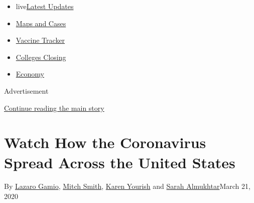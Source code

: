 \begin{itemize}
\tightlist
\item
  live\href{https://www.nytimes3xbfgragh.onion/2020/08/20/world/coronavirus-covid.html?name=styln-coronavirus-national\&region=TOP_BANNER\&variant=undefined\&block=storyline_menu_recirc\&action=click\&pgtype=Interactive\&impression_id=7c496f31-e38e-11ea-9d1b-a1f39ff1b44f}{Latest
  Updates}
\item
  \href{https://www.nytimes3xbfgragh.onion/interactive/2020/us/coronavirus-us-cases.html?name=styln-coronavirus-national\&region=TOP_BANNER\&variant=undefined\&block=storyline_menu_recirc\&action=click\&pgtype=Interactive\&impression_id=7c499640-e38e-11ea-9d1b-a1f39ff1b44f}{Maps
  and Cases}
\item
  \href{https://www.nytimes3xbfgragh.onion/interactive/2020/science/coronavirus-vaccine-tracker.html?name=styln-coronavirus-national\&region=TOP_BANNER\&variant=undefined\&block=storyline_menu_recirc\&action=click\&pgtype=Interactive\&impression_id=7c499641-e38e-11ea-9d1b-a1f39ff1b44f}{Vaccine
  Tracker}
\item
  \href{https://www.nytimes3xbfgragh.onion/2020/08/19/us/colleges-closing-covid.html?name=styln-coronavirus-national\&region=TOP_BANNER\&variant=undefined\&block=storyline_menu_recirc\&action=click\&pgtype=Interactive\&impression_id=7c499642-e38e-11ea-9d1b-a1f39ff1b44f}{Colleges
  Closing}
\item
  \href{https://www.nytimes3xbfgragh.onion/live/2020/08/20/business/stock-market-today-coronavirus?name=styln-coronavirus-national\&region=TOP_BANNER\&variant=undefined\&block=storyline_menu_recirc\&action=click\&pgtype=Interactive\&impression_id=7c499643-e38e-11ea-9d1b-a1f39ff1b44f}{Economy}
\end{itemize}

Advertisement

\protect\hyperlink{after-top}{Continue reading the main story}

\hypertarget{watch-how-the-coronavirus-spread-across-the-united-states}{%
\section{Watch How the Coronavirus Spread Across the United
States}\label{watch-how-the-coronavirus-spread-across-the-united-states}}

By \href{https://www.nytimes3xbfgragh.onion/by/lazaro-gamio}{Lazaro
Gamio}, \href{https://www.nytimes3xbfgragh.onion/by/mitch-smith}{Mitch
Smith}, \href{https://www.nytimes3xbfgragh.onion/by/karen-yourish}{Karen
Yourish} and
\href{https://www.nytimes3xbfgragh.onion/by/sarah-almukhtar}{Sarah
Almukhtar}March 21, 2020


